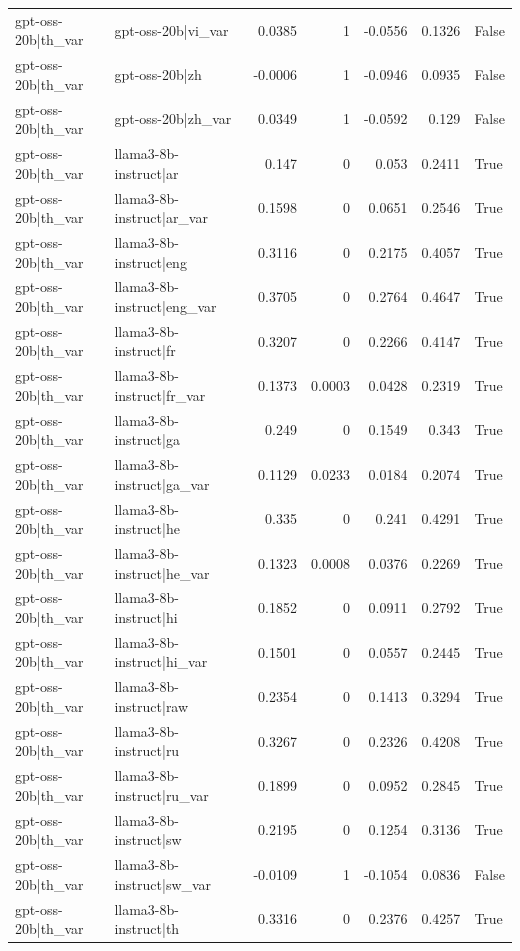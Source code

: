 \begin{table}
\begin{tabular}{l l r r r r l}
gpt-oss-20b|th_var & gpt-oss-20b|vi_var & 0.0385 & 1 & -0.0556 & 0.1326 & False \\
gpt-oss-20b|th_var & gpt-oss-20b|zh & -0.0006 & 1 & -0.0946 & 0.0935 & False \\
gpt-oss-20b|th_var & gpt-oss-20b|zh_var & 0.0349 & 1 & -0.0592 & 0.129 & False \\
gpt-oss-20b|th_var & llama3-8b-instruct|ar & 0.147 & 0 & 0.053 & 0.2411 & True \\
gpt-oss-20b|th_var & llama3-8b-instruct|ar_var & 0.1598 & 0 & 0.0651 & 0.2546 & True \\
gpt-oss-20b|th_var & llama3-8b-instruct|eng & 0.3116 & 0 & 0.2175 & 0.4057 & True \\
gpt-oss-20b|th_var & llama3-8b-instruct|eng_var & 0.3705 & 0 & 0.2764 & 0.4647 & True \\
gpt-oss-20b|th_var & llama3-8b-instruct|fr & 0.3207 & 0 & 0.2266 & 0.4147 & True \\
gpt-oss-20b|th_var & llama3-8b-instruct|fr_var & 0.1373 & 0.0003 & 0.0428 & 0.2319 & True \\
gpt-oss-20b|th_var & llama3-8b-instruct|ga & 0.249 & 0 & 0.1549 & 0.343 & True \\
gpt-oss-20b|th_var & llama3-8b-instruct|ga_var & 0.1129 & 0.0233 & 0.0184 & 0.2074 & True \\
gpt-oss-20b|th_var & llama3-8b-instruct|he & 0.335 & 0 & 0.241 & 0.4291 & True \\
gpt-oss-20b|th_var & llama3-8b-instruct|he_var & 0.1323 & 0.0008 & 0.0376 & 0.2269 & True \\
gpt-oss-20b|th_var & llama3-8b-instruct|hi & 0.1852 & 0 & 0.0911 & 0.2792 & True \\
gpt-oss-20b|th_var & llama3-8b-instruct|hi_var & 0.1501 & 0 & 0.0557 & 0.2445 & True \\
gpt-oss-20b|th_var & llama3-8b-instruct|raw & 0.2354 & 0 & 0.1413 & 0.3294 & True \\
gpt-oss-20b|th_var & llama3-8b-instruct|ru & 0.3267 & 0 & 0.2326 & 0.4208 & True \\
gpt-oss-20b|th_var & llama3-8b-instruct|ru_var & 0.1899 & 0 & 0.0952 & 0.2845 & True \\
gpt-oss-20b|th_var & llama3-8b-instruct|sw & 0.2195 & 0 & 0.1254 & 0.3136 & True \\
gpt-oss-20b|th_var & llama3-8b-instruct|sw_var & -0.0109 & 1 & -0.1054 & 0.0836 & False \\
gpt-oss-20b|th_var & llama3-8b-instruct|th & 0.3316 & 0 & 0.2376 & 0.4257 & True \\

\end{tabular}
\end{table}
